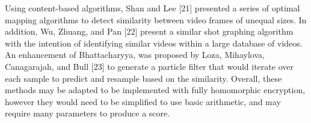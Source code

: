 Using content-based algorithms, Shan and Lee [21] presented a series of optimal mapping algorithms to detect similarity between video frames of unequal sizes. In addition, Wu, Zhuang, and Pan [22] present a similar shot graphing algorithm with the intention of identifying similar videos within a large database of videos. An enhancement of Bhattacharyya, was proposed by Loza, Mihaylova, Canagarajah, and Bull [23] to generate a particle filter that would iterate over each sample to predict and resample based on the similarity. Overall, these methods may be adapted to be implemented with fully homomorphic encryption, however they would need to be simplified to use basic arithmetic, and may require many parameters to produce a score.
